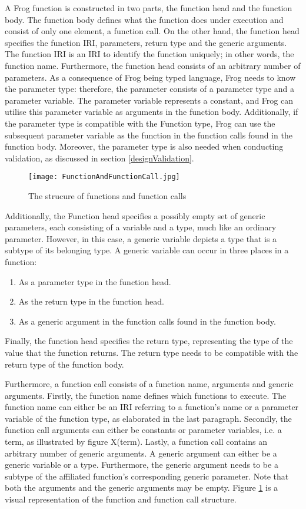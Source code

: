 \para
A Frog function is constructed in two parts, the function head and the function body. The function body defines what the function does under execution and consist of only one element, a function call. On the other hand, the function head specifies the function IRI, parameters, return type and the generic arguments. The function IRI is an IRI to identify the function uniquely; in other words, the function name. Furthermore, the function head consists of an arbitrary number of parameters. As a consequence of Frog being typed language, Frog needs to know the parameter type: therefore, the parameter consists of a parameter type and a parameter variable. The parameter variable represents a constant, and Frog can utilise this parameter variable as arguments in the function body. Additionally, if the parameter type is compatible with the Function type, Frog can use the subsequent parameter variable as the function in the function calls found in the function body. Moreover, the parameter type is also needed when conducting validation, as discussed in section \ref{designValidation}.


\begin{figure}[h]
    \centering
    \texttt{[image: FunctionAndFunctionCall.jpg]}
    \caption{The strucure of functions and function calls}
    \label{fig:functionCall_and_function}
\end{figure}

\para
Additionally, the Function head specifies a possibly empty set of generic parameters, each consisting of a variable and a type, much like an ordinary parameter. However, in this case, a generic variable depicts a type that is a subtype of its belonging type. A generic variable can occur in three places in a function:
\begin{enumerate}
    \item As a parameter type in the function head.
    \item As the return type in the function head.
    \item As a generic argument in the function calls found in the function body.   
\end{enumerate}
Finally, the function head specifies the return type, representing the type of the value that the function returns. The return type needs to be compatible with the return type of the function body. 

\para
Furthermore, a function call consists of a function name, arguments and generic arguments. Firstly, the function name defines which functions to execute. The function name can either be an IRI referring to a function's name or a parameter variable of the function type, as elaborated in the last paragraph. Secondly, the function call arguments can either be constants or parameter variables, i.e. a term, as illustrated by figure X(term). Lastly, a function call contains an arbitrary number of generic arguments. A generic argument can either be a generic variable or a type. Furthermore, the generic argument needs to be a subtype of the affiliated function's corresponding generic parameter. Note that both the arguments and the generic arguments may be empty. Figure \ref{fig:functionCall_and_function} is a visual representation of the function and function call structure.

